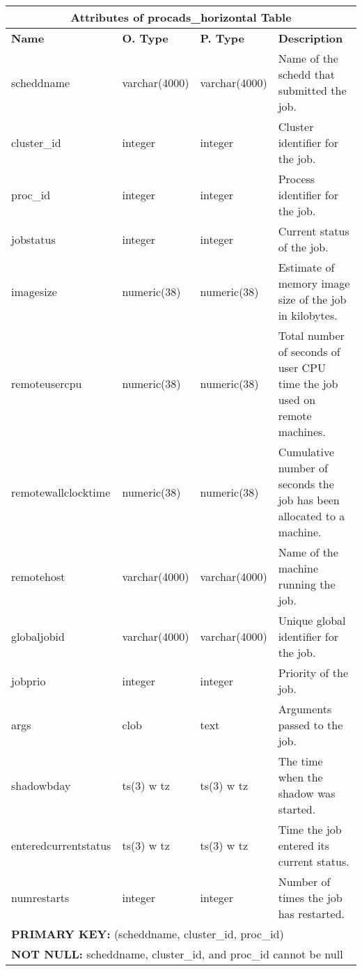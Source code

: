 \begin{center}
  \begin{tabular}{|l|l|l|p{2.6in}|}\hline
    \multicolumn{4}{|c|}{\textbf{Attributes of procads\_horizontal Table}}\\ \hline
    \textbf{Name} & \textbf{O. Type} & \textbf{P. Type} & \textbf{Description}\\ \hline
    scheddname & varchar(4000) & varchar(4000) & Name of the schedd that submitted the job.\\ \hline
    cluster\_id & integer & integer & Cluster identifier for the job.\\ \hline
    proc\_id & integer & integer & Process identifier for the job.\\ \hline
    jobstatus & integer & integer & Current status of the job.\\ \hline
    imagesize & numeric(38) & numeric(38) & Estimate of memory image size of the job in kilobytes.\\ \hline
    remoteusercpu & numeric(38) & numeric(38) & Total number of seconds of user CPU time the job used on remote machines.\\ \hline
    remotewallclocktime & numeric(38) & numeric(38) & Cumulative number of seconds the job has been allocated to a machine.\\ \hline
    remotehost & varchar(4000) & varchar(4000) & Name of the machine running the job.\\ \hline
    globaljobid & varchar(4000) & varchar(4000) & Unique global identifier for the job.\\ \hline
    jobprio & integer & integer & Priority of the job.\\ \hline
    args & clob & text & Arguments passed to the job.\\ \hline
    shadowbday & ts(3) w tz & ts(3) w tz & The time when the shadow was started.\\ \hline
    enteredcurrentstatus & ts(3) w tz & ts(3) w tz & Time the job entered its current status.\\ \hline
    numrestarts & integer & integer & Number of times the job has restarted.\\ \hline
    \multicolumn{4}{|l|}{\textbf{PRIMARY KEY:} (scheddname, cluster\_id, proc\_id)} \\ \hline
    \multicolumn{4}{|l|}{\textbf{NOT NULL:} scheddname, cluster\_id, and proc\_id cannot be null} \\ \hline
  \end{tabular}
\vspace{24pt}


\end{center}
